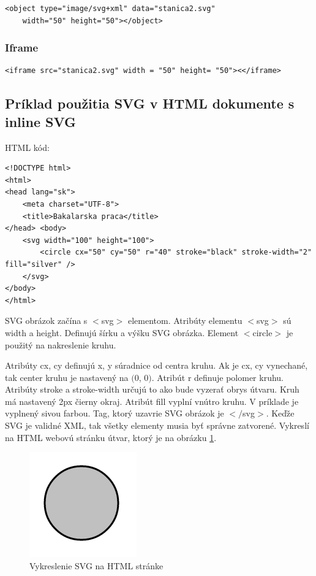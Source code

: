	\begin{lstlisting}
<object type="image/svg+xml" data="stanica2.svg"
	width="50" height="50"></object>
	\end{lstlisting}
	
	
\subsubsection{	Iframe}

	\begin{lstlisting}
<iframe src="stanica2.svg" width = "50" height= "50"><</iframe>
	\end{lstlisting}







\subsection{Príklad použitia SVG v HTML dokumente s inline SVG }

HTML kód: 

\begin{lstlisting}
<!DOCTYPE html>
<html>
<head lang="sk">
	<meta charset="UTF-8">
	<title>Bakalarska praca</title>
</head> <body>
	<svg width="100" height="100">
		<circle cx="50" cy="50" r="40" stroke="black" stroke-width="2" fill="silver" />
	</svg>	
</body>
</html>

\end{lstlisting}

SVG obrázok začína s $<$svg$>$ elementom. Atribúty elementu $<$svg$>$ sú width a height. Definujú šírku a výšku SVG obrázka. Element $<$circle$>$ je použitý na nakreslenie kruhu.

 Atribúty cx, cy definujú x, y súradnice od centra kruhu. Ak je cx, cy vynechané, tak center kruhu je nastavený na $($0, 0$)$. Atribút r  definuje polomer kruhu. Atribúty stroke a stroke-width určujú to ako bude vyzerať obrys útvaru. Kruh má nastavený 2px čierny okraj. 
Atribút fill vyplní vnútro kruhu. V príklade je vyplnený sivou farbou. Tag, ktorý uzavrie SVG obrázok je $<$$/$svg$>$. Keďže SVG je validné XML, tak všetky elementy musia byť správne zatvorené. \cite{inline} Vykreslí na HTML webovú stránku útvar, ktorý je na obrázku \ref{jednoduchyKruh}.

\begin{figure}[hp]
	\begin{center}
		\includegraphics  {obrazky/jednoduchyKruh.png}
		\caption{Vykreslenie SVG na HTML stránke}
		\label{jednoduchyKruh}
	\end{center}
\end{figure}


